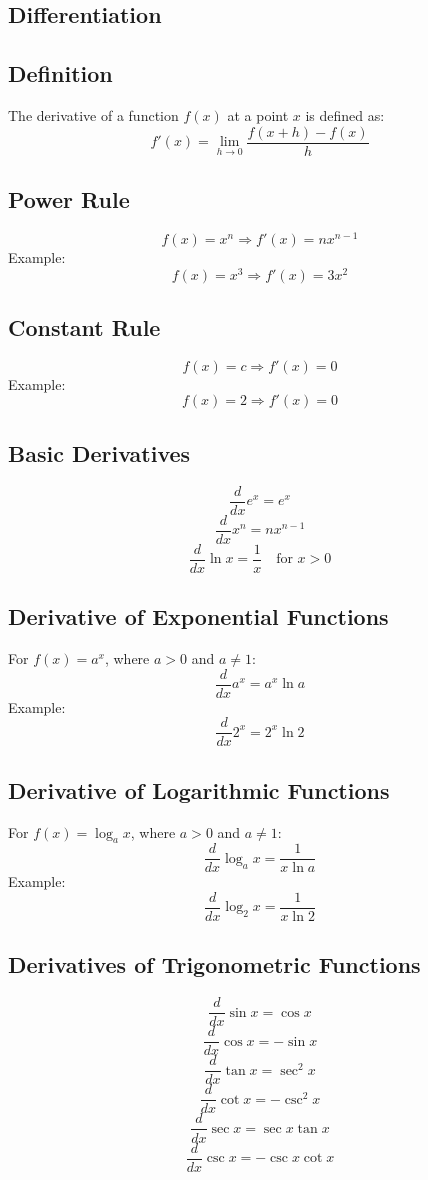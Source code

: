 \documentclass{article}
\begin{document}
\begin{multicols}{2}

\section*{Differentiation}

\subsection*{Definition}

The derivative of a function \( f(x) \) at a point \( x \) is defined as:
\[
f'(x) = \lim_{h \to 0} \frac{f(x+h) - f(x)}{h}
\]

\subsection*{Power Rule}
\[
f(x) = x^n \Rightarrow f'(x) = nx^{n-1}
\]
Example:
\[
f(x) = x^3 \Rightarrow f'(x) = 3x^2
\]

\subsection*{Constant Rule}
\[
f(x) = c \Rightarrow f'(x) = 0
\]
Example:
\[
f(x) = 2 \Rightarrow f'(x) = 0
\]

\subsection*{Basic Derivatives}
\[
\frac{d}{dx} e^x = e^x
\]
\[
\frac{d}{dx} x^n = n x^{n-1}
\]
\[
\frac{d}{dx} \ln x = \frac{1}{x} \quad \text{for } x > 0
\]

\subsection*{Derivative of Exponential Functions}
For \( f(x) = a^x \), where \( a > 0 \) and \( a \neq 1 \):
\[
\frac{d}{dx} a^x = a^x \ln a
\]
Example:
\[
\frac{d}{dx} 2^x = 2^x \ln 2
\]

\subsection*{Derivative of Logarithmic Functions}
For \( f(x) = \log_a x \), where \( a > 0 \) and \( a \neq 1 \):
\[
\frac{d}{dx} \log_a x = \frac{1}{x \ln a}
\]
Example:
\[
\frac{d}{dx} \log_2 x = \frac{1}{x \ln 2}
\]

\subsection*{Derivatives of Trigonometric Functions}
\[
\frac{d}{dx} \sin x = \cos x
\]
\[
\frac{d}{dx} \cos x = -\sin x
\]
\[
\frac{d}{dx} \tan x = \sec^2 x
\]
\[
\frac{d}{dx} \cot x = -\csc^2 x
\]
\[
\frac{d}{dx} \sec x = \sec x \tan x
\]
\[
\frac{d}{dx} \csc x = -\csc x \cot x
\]


\end{multicols}
\end{document}
